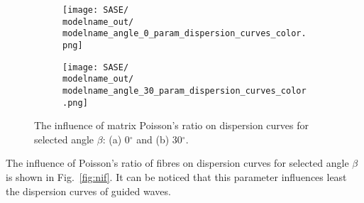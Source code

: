 \documentclass[preprint,12pt]{elsarticle}
\begin{document}
\begin{figure} [h!]
	\centering
	\newcommand{\modelname}{SASE6_plain_weave}
	\begin{subfigure}[b]{0.49\textwidth}
		\centering
		\texttt{[image: SASE/\\modelname\_out/\\modelname\_angle\_0\_param\_dispersion\_curves\_color.png]}
		\caption{}
		\label{fig:nim0}
	\end{subfigure}
	\hfill
	\begin{subfigure}[b]{0.49\textwidth}
		\centering
		\texttt{[image: SASE/\\modelname\_out/\\modelname\_angle\_30\_param\_dispersion\_curves\_color.png]}
		\caption{}
		\label{fig:nim30}
	\end{subfigure}
	\caption{The influence of matrix Poisson's ratio on dispersion curves for selected angle $\beta$: (a) 0$^{\circ}$ and (b) 30$^{\circ}$.}
	\label{fig:nim}
\end{figure}

The influence of Poisson's ratio of fibres  on dispersion curves for selected angle $\beta$ is shown in Fig.~\ref{fig:nif}. It can be noticed that this parameter influences least the dispersion curves of guided waves.
\end{document}
